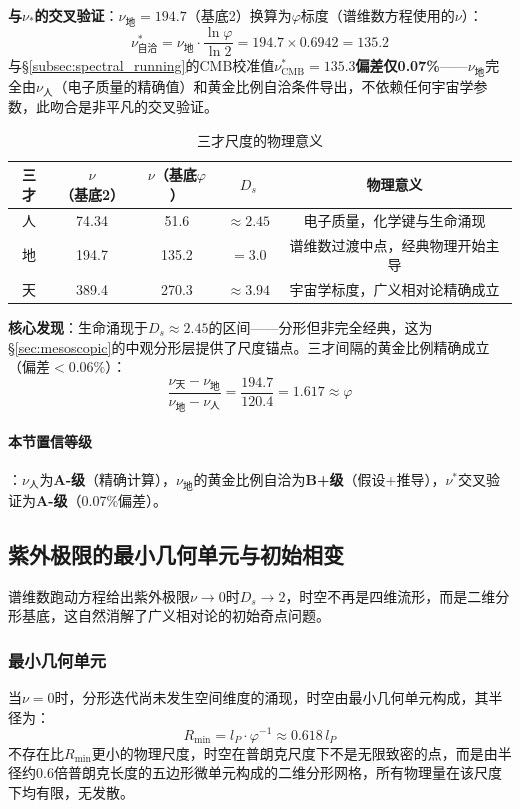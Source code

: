 \documentclass[12pt,a4paper,twocolumn]{article}
\renewcommand{\phi}{\varphi}
\begin{document}
\textbf{与$\nu_*$的交叉验证}：$\nu_{\text{地}} = 194.7$（基底2）换算为$\phi$标度（谱维数方程使用的$\nu$）：
\begin{equation}
\nu^*_{\text{自洽}} = \nu_{\text{地}} \cdot \frac{\ln\phi}{\ln 2} = 194.7 \times 0.6942 = 135.2
\end{equation}
与§\ref{subsec:spectral_running}的CMB校准值$\nu^*_{\text{CMB}} = 135.3$\textbf{偏差仅0.07\%}——$\nu_{\text{地}}$完全由$\nu_{\text{人}}$（电子质量的精确值）和黄金比例自洽条件导出，不依赖任何宇宙学参数，此吻合是非平凡的交叉验证。

\begin{table}[H]
\centering
\caption{三才尺度的物理意义}
\label{tab:three_realms}
\begin{tabular}{c|c|c|c|c}
\hline
三才 & $\nu$（基底2） & $\nu$（基底$\phi$） & $D_s$ & 物理意义 \\
\hline
人 & 74.34 & 51.6 & $\approx 2.45$ & 电子质量，化学键与生命涌现 \\
地 & 194.7 & 135.2 & $= 3.0$ & 谱维数过渡中点，经典物理开始主导 \\
天 & 389.4 & 270.3 & $\approx 3.94$ & 宇宙学标度，广义相对论精确成立 \\
\hline
\end{tabular}
\end{table}

\textbf{核心发现}：生命涌现于$D_s \approx 2.45$的区间——分形但非完全经典，这为§\ref{sec:mesoscopic}的中观分形层提供了尺度锚点。三才间隔的黄金比例精确成立（偏差$< 0.06\%$）：
\[
\frac{\nu_{\text{天}} - \nu_{\text{地}}}{\nu_{\text{地}} - \nu_{\text{人}}} = \frac{194.7}{120.4} = 1.617 \approx \phi
\]

\paragraph{本节置信等级}：$\nu_{\text{人}}$为\textbf{A-级}（精确计算），$\nu_{\text{地}}$的黄金比例自洽为\textbf{B+级}（假设+推导），$\nu^*$交叉验证为\textbf{A-级}（0.07\%偏差）。


\subsection{紫外极限的最小几何单元与初始相变}
\label{subsec:uv_minimal_cell}
谱维数跑动方程给出紫外极限$\nu\to0$时$D_s\to2$，时空不再是四维流形，而是二维分形基底，这自然消解了广义相对论的初始奇点问题。

\subsubsection{最小几何单元}
当$\nu=0$时，分形迭代尚未发生空间维度的涌现，时空由最小几何单元构成，其半径为：
\begin{equation}
R_{\text{min}} = l_P \cdot \phi^{-1} \approx 0.618\, l_P
\end{equation}
不存在比$R_{\text{min}}$更小的物理尺度，时空在普朗克尺度下不是无限致密的点，而是由半径约0.6倍普朗克长度的五边形微单元构成的二维分形网格，所有物理量在该尺度下均有限，无发散。
\end{document}
